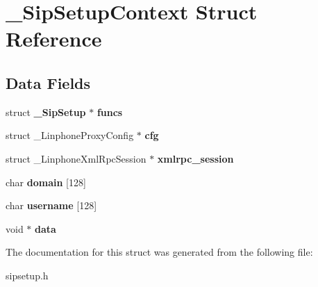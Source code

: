 \section{\+\_\+\+Sip\+Setup\+Context Struct Reference}
\label{struct__SipSetupContext}
\subsection*{Data Fields}
\begin{DoxyCompactItemize}
\item 
\mbox{\label{struct__SipSetupContext_a721b00363ecb4b89127b6c12ab0791c9}} 
struct \textbf{ \+\_\+\+Sip\+Setup} $\ast$ {\bfseries funcs}
\item 
\mbox{\label{struct__SipSetupContext_a93647cbb930df8f689e7390daf55b55f}} 
struct \+\_\+\+Linphone\+Proxy\+Config $\ast$ {\bfseries cfg}
\item 
\mbox{\label{struct__SipSetupContext_adb61d871291c1a355fe2db3ef9544e75}} 
struct \+\_\+\+Linphone\+Xml\+Rpc\+Session $\ast$ {\bfseries xmlrpc\+\_\+session}
\item 
\mbox{\label{struct__SipSetupContext_aa2643597298000f06316327f0a35d1a1}} 
char {\bfseries domain} [128]
\item 
\mbox{\label{struct__SipSetupContext_a75008504bd8f29d9acf9dd1b92b13e4e}} 
char {\bfseries username} [128]
\item 
\mbox{\label{struct__SipSetupContext_abdfa79f267531f3f0d63f08e634f3ecc}} 
void $\ast$ {\bfseries data}
\end{DoxyCompactItemize}


The documentation for this struct was generated from the following file\+:\begin{DoxyCompactItemize}
\item 
sipsetup.\+h\end{DoxyCompactItemize}
